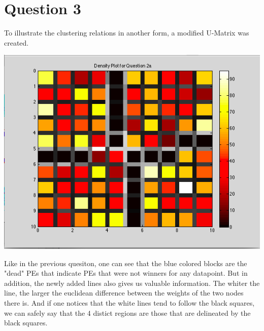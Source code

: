 \documentclass[epsfig]{article}
\begin{document}
\section*{Question 3}
To illustrate the clustering relations in another form, a modified U-Matrix was created. 
\begin{center}
\includegraphics[scale=0.6]{pic6}
\end{center}
Like in the previous quesiton, one can see that the blue colored blocks are the "dead" PEs that indicate PEs that were not winners for any datapoint. But in addition, the newly added lines also gives us valuable information. The whiter the line, the larger the euclidean difference between the weights of the two nodes there is. And if one notices that the white lines tend to follow the black squares, we can safely say that the 4 distict regions are those that are delineated by the black squares.
\newpage
\end{document}
